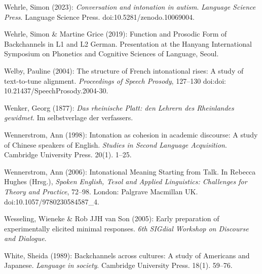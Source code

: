 \begin{styleBibliography}
Wehrle, Simon (2023): \textit{Conversation and intonation in autism}. \textit{Language Science Press}. Language Science Press. doi:10.5281/zenodo.10069004.
\end{styleBibliography}

\begin{styleBibliography}
Wehrle, Simon \& Martine Grice (2019): Function and Prosodic Form of Backchannels in L1 and L2 German. Presentation at the Hanyang International Symposium on Phonetics and Cognitive Sciences of Language, Seoul.
\end{styleBibliography}

\begin{styleBibliography}
Welby, Pauline (2004): The structure of French intonational rises: A study of text-to-tune alignment. \textit{Proceedings of Speech Prosody}, 127–130 doi:doi: 10.21437/SpeechProsody.2004-30.
\end{styleBibliography}

\begin{styleBibliography}
Wenker, Georg (1877): \textit{Das rheinische Platt: den Lehrern des Rheinlandes gewidmet}. Im selbstverlage der verfassers.
\end{styleBibliography}

\begin{styleBibliography}
Wennerstrom, Ann (1998): Intonation as cohesion in academic discourse: A study of Chinese speakers of English. \textit{Studies in Second Language Acquisition}. Cambridge University Press. 20(1). 1–25.
\end{styleBibliography}

\begin{styleBibliography}
Wennerstrom, Ann (2006): Intonational Meaning Starting from Talk. In Rebecca Hughes (Hrsg.), \textit{Spoken English, Tesol and Applied Linguistics: Challenges for Theory and Practice}, 72–98. London: Palgrave Macmillan UK. doi:10.1057/9780230584587\_4.
\end{styleBibliography}

\begin{styleBibliography}
Wesseling, Wieneke \& Rob JJH van Son (2005): Early preparation of experimentally elicited minimal responses. \textit{6th SIGdial Workshop on Discourse and Dialogue}.
\end{styleBibliography}

\begin{styleBibliography}
White, Sheida (1989): Backchannels across cultures: A study of Americans and Japanese. \textit{Language in society}. Cambridge University Press. 18(1). 59–76.
\end{styleBibliography}

